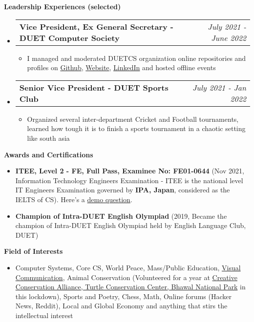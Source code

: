 \documentclass[legalpaper,10pt]{article}
\makeatletter
\newcommand{\resheading}[1]{{\large \colorbox{mygrey}{\begin{minipage}{\textwidth}{\textbf{#1 \vphantom{p\^{E}}}}\end{minipage}}}}
\newcommand{\ressubheading}[4]{
	\begin{tabular*}{7.1in}{l@{\extracolsep{\fill}}r}
		\textbf{#1} & \textit{#4} \\
	\end{tabular*}\vspace{-6pt}}
\makeatother
\begin{document}
	\resheading{Leadership Experiences (selected)}
	\begin{itemize}
		\item \ressubheading{Vice President, Ex General Secretary - DUET Computer Society}{}{}{July 2021 - June 2022}
		\begin{itemize}
		    \item I managed and moderated DUETCS organization online repositories and profiles on \href{https://github.com/duetcs}{Github}, \href{https://duetcs.github.io}{Website}, \href{https://www.linkedin.com/company/duet-computer-society}{LinkedIn} and hosted offline events
		\end{itemize}
		
		\item \ressubheading{Senior Vice President - DUET Sports Club}{}{}{July 2021 - Jan 2022}
		\begin{itemize}
		    \item Organized several inter-department Cricket and Football tournaments, learned how tough it is to finish a sports tournament in a chaotic setting like south asia
		\end{itemize}
		
	\end{itemize}

	\vspace{0.20in}
	
	\resheading{Awards and Certifications}
	\begin{itemize}
	
		\item \textbf{ITEE, Level 2 - FE, Full Pass, Examinee No: FE01-0644} (Nov 2021,  Information Technology Engineers Examination - ITEE is the national level IT Engineers Examination governed by \textbf{IPA, Japan}, considered as the IELTS of CS). Here's a \href{https://drive.google.com/file/d/1CcmWz6TqS86uMLqOgPsLc3_Xd5EdaMMO/view?usp=sharing}{demo question}.
		
		\item \textbf{Champion of Intra-DUET English Olympiad} (2019, Became the champion of Intra-DUET English Olympiad held by English Language Club, DUET)

	\end{itemize}

	\vspace{0.20in}
	
	\resheading{Field of Interests}
		\begin{itemize}
			\item Computer Systems, Core CS,  World Peace, Mass/Public Education, \href{https://www.instagram.com/obepari/}{Visual Communication}, Animal Conservation (Volunteered for a year at \url{} \href{https://www.instagram.com/creativeconservationalliance/}{Creative Conservation Alliance, Turtle Conservation Center, Bhawal National Park} in this lockdown), Sports and Poetry, Chess, Math, Online forums (Hacker News, Reddit), Local and Global Economy and anything that stirs the intellectual interest
		\end{itemize}
\end{document}
